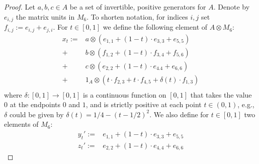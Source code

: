 \documentclass{amsart}
\theoremstyle{definition}
\begin{document}
\begin{proof}
    Let $a,b,c\in A$ be a set of invertible, positive generators for $A$.
    Denote by $e_{i,j}$ the matrix units in $M_6$.
    To shorten notation, for indices $i,j$ set $f_{i,j}:=e_{i,j}+e_{j,i}$.
    For $t\in[0,1]$ we define the following element of $A\otimes M_6$:
    \begin{align*}
        x_t := & a\otimes (e_{1,1} + (1-t)\cdot e_{3,3} + e_{5,5}) \\
            + & b\otimes (f_{1,2} + (1-t)\cdot f_{3,4} + f_{5,6}) \\
            + & c \otimes (e_{2,2} + (1-t)\cdot e_{4.4} + e_{6,6}) \\
            + & 1_A \otimes (t\cdot f_{2,3} + t\cdot f_{4,5} + \delta(t)\cdot f_{1,3}) \\
    \end{align*}
    where $\delta\colon[0,1]\to[0,1]$ is a continuous function on $[0,1]$ that takes the value $0$ at the endpoints $0$ and $1$, and is strictly positive at each point $t\in (0,1)$, e.g., $\delta$ could be given by $\delta(t)=1/4-(t-1/2)^2$.
    We also define for $t\in[0,1]$ two elements of $M_6$:
    \begin{align*}
        y_t' := & e_{1,1} + (1-t)\cdot e_{3,3} + e_{5,5} \\
        z_t' := & e_{2,2} + (1-t)\cdot e_{4,4} + e_{6,6}
    \end{align*}


\end{proof}
\end{document}
